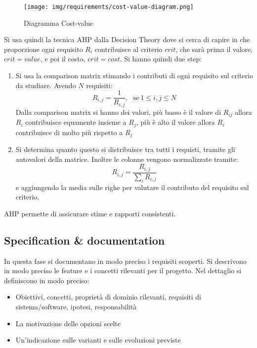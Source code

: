 \begin{figure}[!ht]
      \centering
      \texttt{[image: img/requirements/cost-value-diagram.png]}
      \caption{Diagramma Cost-value}
      \label{fig:cost-value-diagram}
\end{figure}

Si usa quindi la tecnica AHP dalla Decision Theory dove si cerca di capire in che
proporzione ogni requisito $R_i$ contribuisce al criterio $crit$, che sarà prima
il valore, $crit = value$, e poi il costo, $crit = cost$. Si hanno quindi due step:
\begin{enumerate}
      \item Si usa la comparison matrix stimando i contributi di ogni requisito sul
            criterio da studiare. Avendo $N$ requisiti:
            \begin{equation}
                  R_{i, j} = \frac{1}{R_{i, j}}, \ \ \ \text{se} \ 1 \leq i, j\leq N
            \end{equation}
            Dalla comparison matrix si hanno dei valori, più basso è il valore di $R_{ij}$
            allora $R_i$ contribuisce equamente insieme a $R_j$, più è alto il valore allora
            $R_i$ contribuisce  di molto più rispetto a $R_j$
      \item Si determina quanto questo si distribuisce tra tutti i requisti, tramite
            gli autovalori della matrice. Inoltre le colonne vengono normalizzate tramite:
            \begin{equation}
                  R_{i, j} = \frac{R_{i, j}}{\sum_i R_{i, j}}
            \end{equation}
            e aggiungendo la media sulle righe per valutare il contributo del requisito
            sul criterio.
\end{enumerate}
AHP permette di assicurare stime e rapporti consistenti.

\subsection{Specification \& documentation}
In questa fase si documentano in modo preciso i requisiti scoperti. Si descrivono
in modo preciso le feature e i concetti rilevanti per il progetto. Nel dettaglio
si definiscono in modo preciso:
\begin{itemize}
    \item Obiettivi, concetti, proprietà di dominio rilevanti, requisiti di
          sistema/software, ipotesi, responsabilità
    \item La motivazione delle opzioni scelte
    \item Un'indicazione sulle varianti e sulle evoluzioni previste
\end{itemize}

